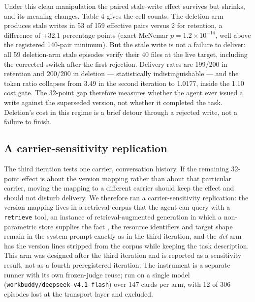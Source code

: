 \documentclass[11pt]{article}
\begin{document}
\begin{sloppypar}
Under this clean manipulation the paired stale-write effect survives but shrinks, and its meaning changes. Table 4 gives the cell counts. The deletion arm produces stale writes in 53 of 159 effective pairs versus 2 for retention, a difference of +32.1 percentage points (exact McNemar $p=1.2\times10^{-14}$, well above the registered 140-pair minimum). But the stale write is not a failure to deliver: all 59 deletion-arm stale episodes verify their 40 files at the live target, including the corrected switch after the first rejection. Delivery rates are 199/200 in retention and 200/200 in deletion --- statistically indistinguishable --- and the token ratio collapses from 3.49 in the second iteration to 1.0177, inside the 1.10 cost gate. The 32-point gap therefore measures whether the agent ever issued a write against the superseded version, not whether it completed the task. Deletion's cost in this regime is a brief detour through a rejected write, not a failure to finish.

\begin{table}[t]
\centering
\caption{Third iteration, 200 cards per arm. \emph{delivered} counts episodes verifying all 40 files at the live target; \emph{ok before inj.} counts accepted \texttt{write} calls before invalidation. The final row is the effective paired contrast (deletion stale vs.\ retention stale) and the paired token ratio.}
\label{tab:4}

\end{table}

\subsection{A carrier-sensitivity replication}
\label{sec:sa}

The third iteration tests one carrier, conversation history. If the remaining 32-point effect is about the version mapping rather than about that particular carrier, moving the mapping to a different carrier should keep the effect and should not disturb delivery. We therefore ran a carrier-sensitivity replication: the version mapping lives in a retrieval corpus that the agent can query with a \texttt{retrieve} tool, an instance of retrieval-augmented generation in which a non-parametric store supplies the fact \cite{lewis2020rag}, the resource identifiers and target shape remain in the system prompt exactly as in the third iteration, and the \emph{del} arm has the version lines stripped from the corpus while keeping the task description. This arm was designed after the third iteration and is reported as a sensitivity result, not as a fourth preregistered iteration. The instrument is a separate runner with its own frozen-judge reuse; run on a single model (\texttt{workbuddy/deepseek-v4.1-flash}) over 147 cards per arm, with 12 of 306 episodes lost at the transport layer and excluded.


\end{sloppypar}
\end{document}
